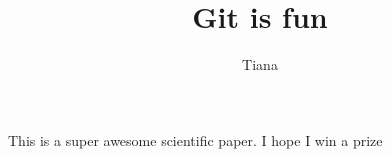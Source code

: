 \documentclass[10pt]{article}
\author{Tiana}
\title{Git is fun}
\begin{document}
	\maketitle

	This is a super awesome scientific paper.
	I hope I win a prize
\end{document}
